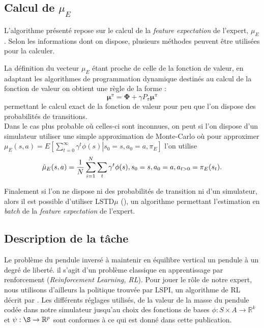 \documentclass[publibook-draft]{CAp2012}
\begin{document}
\subsection{Calcul de $\mu_E$}
\label{calculmu.sec}
L'algorithme présenté repose sur le calcul de la {\it feature expectation} de l'expert, $\mu_E$. Selon les informations dont on dispose, plusieurs méthodes peuvent être utilisées pour la calculer.

La définition du vecteur $\mu_E$ étant proche de celle de la fonction de valeur, en adaptant les algorithmes de programmation dynamique destinés au calcul de la fonction de valeur on obtient une règle de la forme :
\begin{equation}
\mathbf \mu^\pi = \mathbf\Phi + \gamma P_\pi\mathbf\mu^\pi
\end{equation}
permettant le calcul exact de la fonction de valeur pour peu que l'on dispose des probabilités de transitions.\\

Dans le cas plus probable où celles-ci sont inconnues, on peut si l'on dispose d'un simulateur utiliser une simple approximation de Monte-Carlo où pour approximer $\mu_E(s,a) = E\left.\left[\sum\limits_{t=0}^\infty \gamma^t \phi(s)\right|s_0 = s, a_0 = a, \pi_E\right]$ l'on utilise
\begin{equation}
\hat\mu_E(s,a) = {1\over N}\sum\limits_{i=1}^{N}\sum\limits_{t}\gamma^t\phi(s), s_0=s, a_0=a, a_{t>0} = \pi_E(s_t).
\end{equation}

Finalement si l'on ne dispose ni des probabilités de transition ni d'un simulateur, alors il est possible d'utiliser LSTD$\mu$ (\citep{klein2011batch}), un algorithme permettant l'estimation en {\it batch} de la {\it feature expectation} de l'expert.
\subsection{Description de la tâche}
Le problème du pendule inversé à maintenir en équilibre vertical un pendule à un degré de liberté. il s'agit d'un problème classique en apprentissage par renforcement ({\it Reinforcement Learning, RL}). Pour jouer le rôle de notre expert, nous utilisons d'ailleurs la politique trouvée par LSPI, un algorithme de RL décrit par \citet{lagoudakis2003least}. Les différents réglages utilisés, de la valeur de la masse du pendule codée dans notre simulateur jusqu'au choix des fonctions de bases $\phi : S\times A \rightarrow \mathbb{R}^k$ et $\psi : \S \rightarrow \mathbb{R}^p$ sont conformes à ce qui est donné dans cette publication.\\
\end{document}
